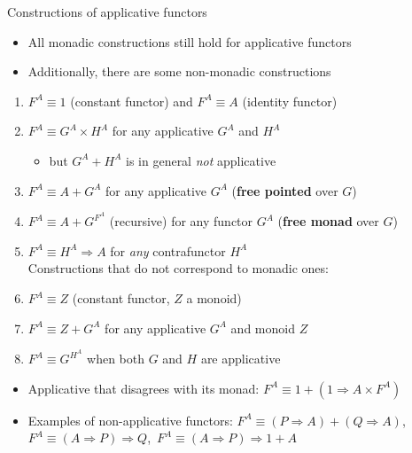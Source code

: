 \documentclass[english]{beamer}
\begin{document}
\begin{frame}{Constructions of applicative functors}
\begin{itemize}
\item \vspace{-0.10cm}All monadic constructions still hold for applicative
functors
\item Additionally, there are some non-monadic constructions
\end{itemize}
\begin{enumerate}
\item $F^{A}\equiv1$ (constant functor) and $F^{A}\equiv A$ (identity
functor)
\item $F^{A}\equiv G^{A}\times H^{A}$ for any applicative $G^{A}$ and
$H^{A}$
\begin{itemize}
\item but $G^{A}+H^{A}$ is in general \emph{not} applicative
\end{itemize}
\item $F^{A}\equiv A+G^{A}$ for any applicative $G^{A}$ (\textbf{free
pointed} over $G$)
\item $F^{A}\equiv A+G^{F^{A}}$ (recursive) for any functor $G^{A}$ (\textbf{free
monad} over $G$)
\item $F^{A}\equiv H^{A}\Rightarrow A$ for \emph{any} contrafunctor $H^{A}$\\
Constructions that do not correspond to monadic ones:
\item $F^{A}\equiv Z$ (constant functor, $Z$ a monoid)
\item $F^{A}\equiv Z+G^{A}$ for any applicative $G^{A}$ and monoid $Z$
\item $F^{A}\equiv G^{H^{A}}$ when both $G$ and $H$ are applicative
\end{enumerate}
\begin{itemize}
\item Applicative that disagrees with its monad: $F^{A}\equiv1+\left(1\Rightarrow A\times F^{A}\right)$ 
\item Examples of non-applicative functors: $F^{A}\equiv\left(P\Rightarrow A\right)+\left(Q\Rightarrow A\right)$,
$F^{A}\equiv\left(A\Rightarrow P\right)\Rightarrow Q$,\  $F^{A}\equiv\left(A\Rightarrow P\right)\Rightarrow1+A$
\end{itemize}
\end{frame}
\end{document}
